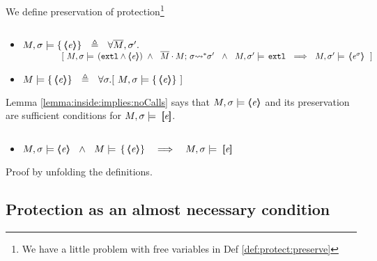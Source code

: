\documentclass[acmsmall,review,anonymous,screen]{acmart}\settopmatter{printfolios=true,printacmref=false}
\begin{document}
{We define preservation of protection\footnote{We have a little problem with free variables in Def  \ref{def:protect:preserve}}

\begin{definition}
$~ \ $
\label{def:protect:preserve}

\begin{itemize}

\item
$M, \sigma \models  {\{}\,  \langle\!\!\langle \mathit{e} \rangle\!\!\rangle {\}}\ \ \triangleq \ \ \forall \overline{M}, \sigma'.$\\
$\strut ~ \hspace{1.5cm} [\ M, \sigma \models\, ( \extThis \wedge \inside {\re} )\ \wedge \ \ \leadstoBoundedStar  {\Mtwo\cdot M} {\sigma} {\sigma'}\ \ \wedge\ \ M, \sigma' \models\,   \extThis\ \ \Longrightarrow \ \ M, \sigma' \models\,  \inside {\as \re \sigma}\ \ ]$


\item
$M \models  \preserve { \inside {\re} }\ \ \triangleq \ \ \forall \sigma.[\  M, \sigma \models  \preserve { \inside {\re} }\  ] $\\
 
\end{itemize}

\end{definition}

 
Lemma \ref{lemma:inside:implies:noCalls} says that $M , \sigma \models \langle\!\!\langle \mathit{e} \rangle\!\!\rangle $ and its preservation are sufficient conditions for $M, \sigma \models \  [\!\![ \mathit{e} ]\!\!]$. 
 
\begin{lemma}
$~ $ \\
\label{lemma:inside:implies:noCalls}
\begin{itemize}

\item
$\satisfiesA{M}{\sigma} {\inside {\re} }   \ \ \wedge\ \ M \models \,  \preserve { \inside {\re} }\ \ \ 
 \Longrightarrow \ \ \  M, \sigma \models \  \insidef{\re}$

\end{itemize}
\end{lemma}

Proof by unfolding the definitions. 

\subsection{Protection as an almost necessary  condition}

}
\end{document}
